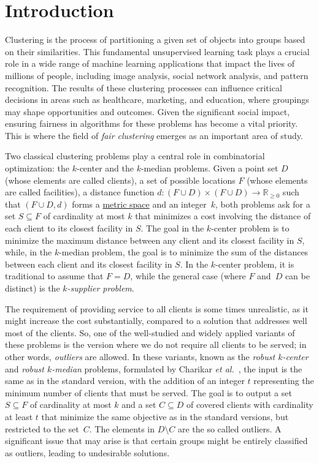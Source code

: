 \chapter{Introduction}
\label{cap:introduction}
\newcommand{\NP}{\mathit{NP}}
\newcommand{\eps}{\epsilon}
Clustering is the process of partitioning a given set of objects into groups based on their similarities. 
This fundamental unsupervised learning task plays a crucial role in a wide range of machine learning applications that impact the lives of millions of people, including image analysis, social network analysis, and pattern recognition. 
The results of these clustering processes can influence critical decisions in areas such as healthcare, marketing, and education, where groupings may shape opportunities and outcomes.
Given the significant social impact, ensuring fairness in algorithms for these problems has become a vital priority. 
This is where the field of \emph{fair clustering} emerges as an important area of study.

Two classical clustering problems play a central role in combinatorial optimization: the $k$-center and the $k$-median problems. 
Given a point set $D$ (whose elements are called clients), a set of possible locations $F$ (whose elements are called facilities), a distance function $d : (F \cup D) \times (F \cup D) \rightarrow \mathbb{R}_{\geq 0}$ such that $(F\cup D, d)$ forms a \href{https://en.wikipedia.org/wiki/Metric_space}{metric space} and an integer~$k$, both problems ask for a set $S \subseteq F$ of cardinality at most $k$ that minimizes a cost involving the distance of each client to its closest facility in $S$.
The goal in the $k$-center problem is to minimize the maximum distance between any client and its closest facility in $S$, while, in the $k$-median problem, the goal is to minimize the sum of the distances between each client and its closest facility in $S$.
In the $k$-center problem, it is traditional to assume that $F=D$, while the general case (where $F$ and~$D$ can be distinct) is the \emph{$k$-supplier problem}.

The requirement of providing service to all clients is some times unrealistic, as it might increase the cost substantially, compared to a solution that addresses well most of the clients. 
So, one of the well-studied and widely applied variants of these problems is the version where we do not require all clients to be served; in other words, \emph{outliers} are allowed. 
In these variants, known as the \emph{robust $k$-center} and \emph{robust $k$-median} problems, formulated by Charikar \emph{et al.}~\cite{CharikarKMN2001}, the input is the same as in the standard version, with the addition of an integer $t$ representing the minimum number of clients that must be served. 
The goal is to output a set $S \subseteq F$ of cardinality at most $k$ and a set $C \subseteq D$ of covered clients with cardinality at least $t$ that minimize the same objective as in the standard versions, but restricted to the set~$C$.  The elements in $D \setminus C$ are the so called outliers.  A significant issue that may arise is that certain groups might be entirely classified as outliers, leading to undesirable solutions.

